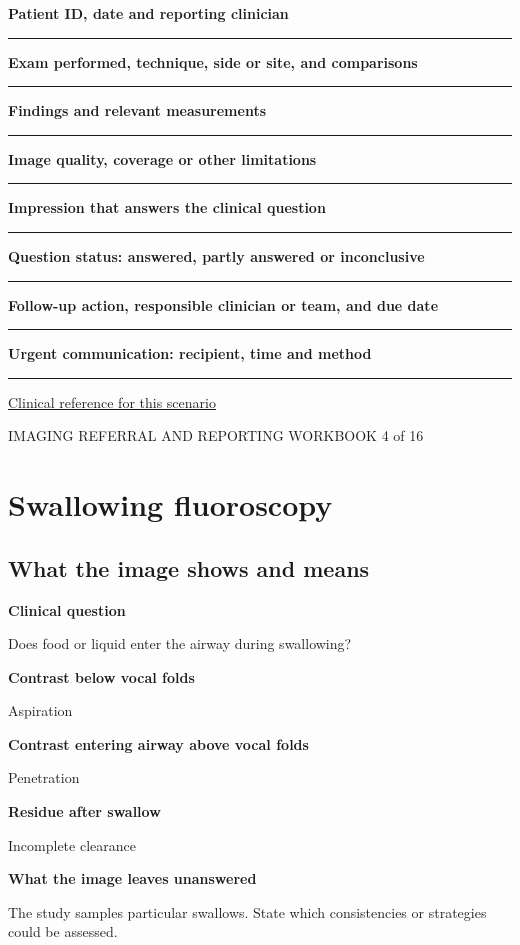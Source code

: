 \documentclass[11pt,a4paper]{article}
\newcommand{\record}[1]{\textbf{#1}\par\vspace{0.55\baselineskip}\hrule\vspace{0.35\baselineskip}}
\begin{document}
\record{Patient ID, date and reporting clinician}

\record{Exam performed, technique, side or site, and comparisons}

\record{Findings and relevant measurements}

\record{Image quality, coverage or other limitations}

\record{Impression that answers the clinical question}

\record{Question status: answered, partly answered or inconclusive}

\record{Follow-up action, responsible clinician or team, and due date}

\record{Urgent communication: recipient, time and method}

\small\href{https://acsearch.acr.org/docs/69471/Narrative}{Clinical reference for this scenario}

\normalsize

\newpage

{\small IMAGING REFERRAL AND REPORTING WORKBOOK \hfill 4 of 16}

\section*{Swallowing fluoroscopy}

\subsection*{What the image shows and means}

\textbf{Clinical question}\par Does food or liquid enter the airway during swallowing?\par

\textbf{Contrast below vocal folds}\par Aspiration\par

\textbf{Contrast entering airway above vocal folds}\par Penetration\par

\textbf{Residue after swallow}\par Incomplete clearance\par

\textbf{What the image leaves unanswered}\par The study samples particular swallows. State which consistencies or strategies could be assessed.\par
\end{document}

